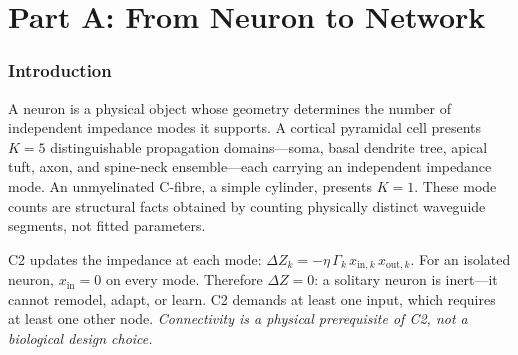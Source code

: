 \documentclass[aps,pre,twocolumn,superscriptaddress,floatfix]{revtex4-2}
\begin{document}
\begin{abstract}
\textbf{Part~D} presents experimental evidence and
extensions: thermal
vulnerability scaling as $K^{3/2}$, willpower as a
three-factor product, sensory-deprivation collapse,
pain as topological crosstalk and bandwidth hijacking,
coupled inter-agent consciousness, impedance calibration,
the physics of intuition,
K-growth simulation producing standing-wave cortical
parcellation ($\sim 9$ functional segments),
and C3 relay as a phase-transition quarter-wave
transformer ($71\%$~$\Gamma^2$ reduction).

\medskip\noindent
\textbf{Circularity disclosure.}
All computational experiments use simulation modules built
from C1--C3 themselves; they demonstrate internal
consistency, not empirical validity.
External tests are reported in
Papers~2--5~\cite{Paper2,Paper3,Paper4,Paper5}.
\end{abstract}

\maketitle



\part*{Part A: From Neuron to Network}

\section{Introduction}
\label{sec:intro}

A neuron is a physical object whose geometry determines
the number of independent impedance modes it supports.
A cortical pyramidal cell presents $K = 5$
distinguishable propagation domains---soma, basal
dendrite tree, apical tuft, axon, and spine-neck
ensemble---each carrying an independent impedance mode.
An unmyelinated C-fibre, a simple cylinder, presents
$K = 1$.
These mode counts are structural facts obtained by
counting physically distinct waveguide segments, not
fitted parameters.

C2 updates the impedance at each mode:
$\Delta Z_k = -\eta\,\Gamma_k\,x_{\text{in},k}\,x_{\text{out},k}$.
For an isolated neuron, $x_{\text{in}} = 0$ on every mode.
Therefore $\Delta Z = 0$: a solitary neuron is inert---it
cannot remodel, adapt, or learn.
C2 demands at least one input, which requires at least one
other node.
\emph{Connectivity is a physical prerequisite of C2, not a
biological design choice.}
\end{document}
